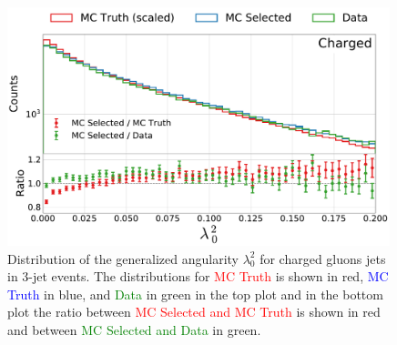 \FloatBarrier
\newpage

\begin{figure}[h!]
  \centerfloat
  \includegraphics[width=0.99\textwidth, trim=0 0 0 0, clip, page=1]{figures/quarks/generalized_angularities_cha-down_sample=1.00-ML_vars=vertex-selection=b-ejet_min=4-n_iter_RS_lgb=99-n_iter_RS_xgb=9-cdot_cut=0.90-version=19.pdf}
  \caption[Generalized Angularities for Charged Gluons Jets: $\lambda_0^2$]
          {Distribution of the generalized angularity $\lambda_0^2$ for charged gluons jets in 3-jet events. The distributions for \textcolor{red}{MC Truth} is shown in red, \textcolor{blue}{MC Truth} in blue, and \textcolor{green}{Data} in green in the top plot and in the bottom plot the ratio between \textcolor{red}{MC Selected and MC Truth} is shown in red and between \textcolor{green}{MC Selected and Data} in green. }
  \label{fig:q:generalized_angularities_cha_lambda_0_2}
\end{figure}
